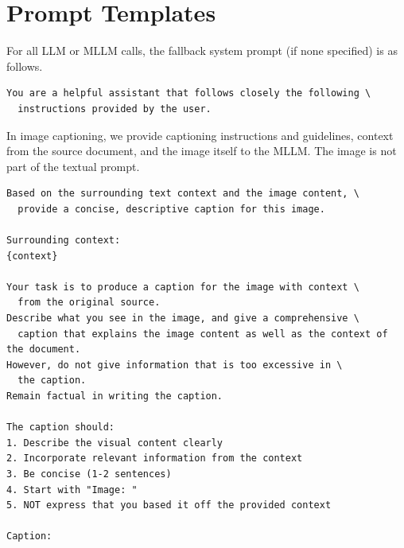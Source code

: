 \section{Prompt Templates}
\label{appendix:prompts}

For all LLM or MLLM calls, the fallback system prompt (if none specified) is as follows.
\begin{verbatim}
You are a helpful assistant that follows closely the following \
  instructions provided by the user.
\end{verbatim}

In image captioning, we provide captioning instructions and guidelines, context from the source document,
and the image itself to the MLLM.
The image is not part of the textual prompt.
\begin{verbatim}
Based on the surrounding text context and the image content, \
  provide a concise, descriptive caption for this image.

Surrounding context:
{context}

Your task is to produce a caption for the image with context \
  from the original source.
Describe what you see in the image, and give a comprehensive \
  caption that explains the image content as well as the context of the document.
However, do not give information that is too excessive in \
  the caption. 
Remain factual in writing the caption.

The caption should:
1. Describe the visual content clearly
2. Incorporate relevant information from the context
3. Be concise (1-2 sentences)
4. Start with "Image: "
5. NOT express that you based it off the provided context

Caption:
\end{verbatim}


